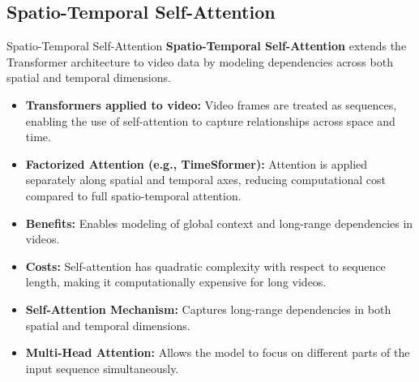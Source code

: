 \subsection{Spatio-Temporal Self-Attention}
\begin{frame}[allowframebreaks]{Spatio-Temporal Self-Attention}
    \textbf{Spatio-Temporal Self-Attention} extends the Transformer architecture to video data by modeling dependencies across both spatial and temporal dimensions.

    \begin{itemize}
        \item \textbf{Transformers applied to video:} Video frames are treated as sequences, enabling the use of self-attention to capture relationships across space and time.
        \item \textbf{Factorized Attention (e.g., TimeSformer):} Attention is applied separately along spatial and temporal axes, reducing computational cost compared to full spatio-temporal attention.
        \item \textbf{Benefits:} Enables modeling of global context and long-range dependencies in videos.
        \item \textbf{Costs:} Self-attention has quadratic complexity with respect to sequence length, making it computationally expensive for long videos.
    \end{itemize}
\framebreak
    \begin{itemize}
        \item \textbf{Self-Attention Mechanism:} Captures long-range dependencies in both spatial and temporal dimensions.
        \item \textbf{Multi-Head Attention:} Allows the model to focus on different parts of the input sequence simultaneously.
    \end{itemize}
\end{frame}
